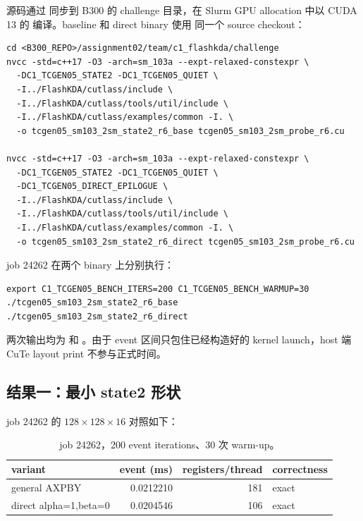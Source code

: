 源码通过  同步到 B300 的 challenge 目录，在 Slurm GPU allocation
中以 CUDA 13 的  编译。baseline 和 direct binary 使用
同一个 source checkout：

\begin{lstlisting}
cd <B300_REPO>/assignment02/team/c1_flashkda/challenge
nvcc -std=c++17 -O3 -arch=sm_103a --expt-relaxed-constexpr \
  -DC1_TCGEN05_STATE2 -DC1_TCGEN05_QUIET \
  -I../FlashKDA/cutlass/include \
  -I../FlashKDA/cutlass/tools/util/include \
  -I../FlashKDA/cutlass/examples/common -I. \
  -o tcgen05_sm103_2sm_state2_r6_base tcgen05_sm103_2sm_probe_r6.cu

nvcc -std=c++17 -O3 -arch=sm_103a --expt-relaxed-constexpr \
  -DC1_TCGEN05_STATE2 -DC1_TCGEN05_QUIET \
  -DC1_TCGEN05_DIRECT_EPILOGUE \
  -I../FlashKDA/cutlass/include \
  -I../FlashKDA/cutlass/tools/util/include \
  -I../FlashKDA/cutlass/examples/common -I. \
  -o tcgen05_sm103_2sm_state2_r6_direct tcgen05_sm103_2sm_probe_r6.cu
\end{lstlisting}

job 24262 在两个 binary 上分别执行：

\begin{lstlisting}
export C1_TCGEN05_BENCH_ITERS=200 C1_TCGEN05_BENCH_WARMUP=30
./tcgen05_sm103_2sm_state2_r6_base
./tcgen05_sm103_2sm_state2_r6_direct
\end{lstlisting}

两次输出均为 \code{Relative error = 0} 和
。由于 event 区间只包住已经构造好的
kernel launch，host 端 CuTe layout print 不参与正式时间。

\subsection{结果一：最小 state2 形状}

job 24262 的 \(128\times128\times16\) 对照如下：

\begin{table}[htbp]
\centering
\small
\begin{tabular}{l r r l}
\toprule
variant & event (ms) & registers/thread & correctness \\
\midrule
general AXPBY & 0.0212210 & 181 & exact \\
direct alpha=1,beta=0 & 0.0204546 & 106 & exact \\
\bottomrule
\end{tabular}
\caption{job 24262，200 event iterations、30 次 warm-up。}
\end{table}

